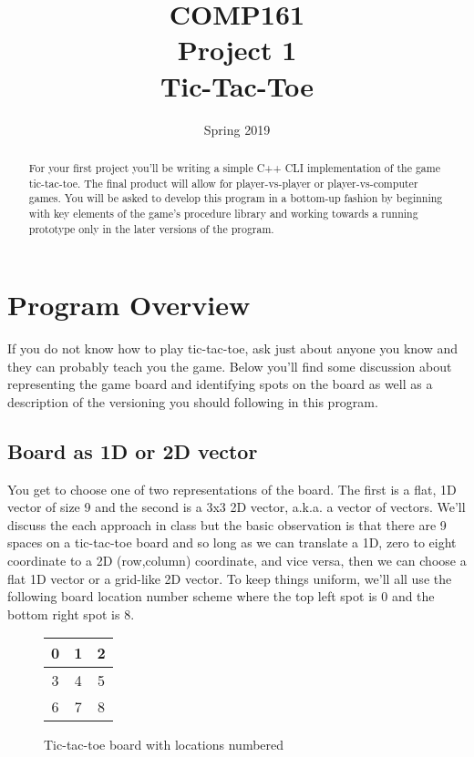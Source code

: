 \documentclass[]{tufte-handout}
\title{COMP161 \\ Project 1 \\ Tic-Tac-Toe}
\author{}
\date{Spring 2019}
\begin{document}
\maketitle

\begin{abstract}
For your first project you'll be writing a simple C++ CLI implementation
of the game tic-tac-toe. The final product will allow for player-vs-player or
player-vs-computer games.  You will be asked to develop this program in a bottom-up
fashion by beginning with key elements of the game's procedure library and working
towards a running prototype only in the later versions of the program.
\end{abstract}

\section{Program Overview}

If you do not know how to play tic-tac-toe, ask just about anyone you know and
they can probably teach you the game.  Below you'll find some discussion about
representing the game board and identifying spots on the board as well as
a description of the versioning you should following in this program.

\subsection{Board as 1D or 2D vector}

You get to choose one of two representations of the board. The first is a
flat, 1D vector of size 9 and the second is a 3x3 2D vector, a.k.a. a vector of
vectors. We'll discuss the each approach in class but the basic observation
is that there are 9 spaces on a tic-tac-toe board and so long as we can translate
a 1D, zero to eight coordinate to a 2D (row,column) coordinate, and vice versa,
then we can choose a flat 1D vector or a grid-like 2D vector.  To keep things
uniform, we'll all use the following board location number scheme where
the top left spot is 0 and the bottom right spot is 8.

\begin{figure}
  \begin{tabular}{@{}|c|c|c|@{}}
    \midrule 0 & 1 & 2 \\
    \midrule 3 & 4 & 5 \\
    \midrule 6 & 7 & 8 \\
    \midrule
  \end{tabular}
  \caption{Tic-tac-toe board with locations numbered}
\end{figure}
\end{document}

